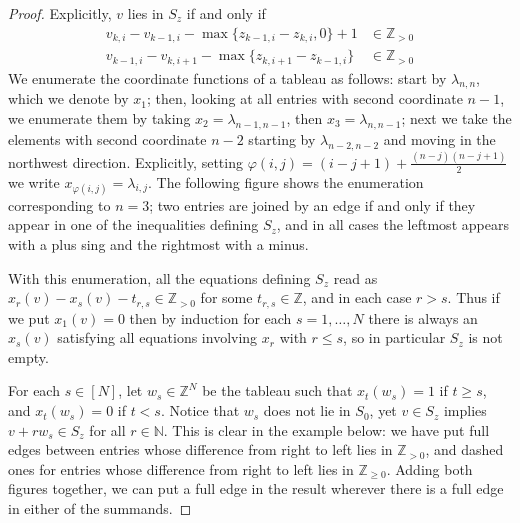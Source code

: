 \documentclass[11pt,fleqn]{article}
\newcommand\NN{\mathbb N}
\newcommand\ZZ{\mathbb Z}
\renewcommand\phi{\varphi}
\begin{document}
\begin{proof}
Explicitly, $v$ lies in $S_z$ if and only if
\begin{align*}
v_{k,i} - v_{k-1,i} - \max\{z_{k-1,i} - z_{k,i}, 0\} +1 &\in \ZZ_{> 0} \\
v_{k-1,i} - v_{k,i+1} - \max\{z_{k,i+1} - z_{k-1,i}\}&\in \ZZ_{>0} 
\end{align*}
We enumerate the coordinate functions of a tableau as follows: start by 
$\lambda_{n,n}$, which we denote by $x_1$; then, looking at all entries with 
second coordinate $n-1$, we enumerate them by taking $x_2 = \lambda_{n-1,n-1}$, then $x_3 = \lambda_{n,n-1}$; next 
we take the elements with second coordinate $n-2$ starting by $\lambda_{n-2,n-2}$ and 
moving in the northwest direction. Explicitly, setting $\phi(i,j) = (i-j+1) + 
\frac{(n-j)(n-j+1)}{2}$ we write $x_{\phi(i,j)} = \lambda_{i,j}$. The following figure
shows the enumeration corresponding to $n = 3$; two entries are joined by an edge if
and only if they appear in one of the inequalities defining $S_z$, and in all cases
the leftmost appears with a plus sing and the rightmost with a minus.


With this enumeration, all the equations 
defining $S_z$ read as $x_r(v) - x_s(v) - t_{r,s} \in \ZZ_{>0}$ for some 
$t_{r,s} \in \ZZ$, and in each case $r > s$. Thus if we put $x_1(v) = 0$ then 
by induction for each $s = 1, \ldots, N$ there is always an $x_s(v)$ 
satisfying all equations involving $x_r$ with $r\leq s$, so in particular $S_z$
is not empty. 

For each $s \in [N]$, let $w_s \in \ZZ^N$ be the tableau such that $x_t(w_s) 
= 1$ if $t \geq s$, and $x_t(w_s) = 0$ if $t < s$. Notice that $w_s$ does not
lie in $S_0$, yet $v \in S_z$ implies $v + r w_s \in S_z$ for all $r \in \NN$. 
This is clear in the example below: we have put full edges between entries 
whose difference from right to left lies in $\ZZ_{>0}$, and dashed ones for 
entries whose difference from right to left lies in $\ZZ_{\geq 0}$. Adding 
both figures together, we can put a full edge in the result wherever there is 
a full edge in either of the summands.


\end{proof}
\end{document}
